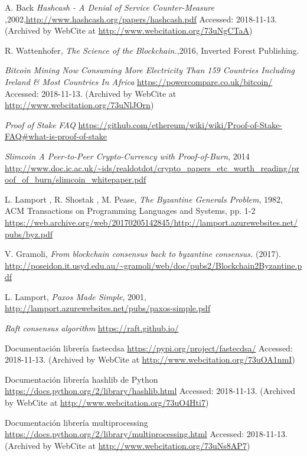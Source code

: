 \documentclass[final, 12pt,oneside]{class_diss}
\begin{document}
\begin{thebibliography}{10}
 A. Back \textit{Hashcash - A Denial of Service Counter-Measure
},2002,\url{http://www.hashcash.org/papers/hashcash.pdf} Accessed: 2018-11-13. (Archived by WebCite at \url{http://www.webcitation.org/73uNgCTaA})

R. Wattenhofer, \textit{The Science of the Blockchain.},2016, Inverted Forest Publishing.

 \textit{Bitcoin Mining Now Consuming More Electricity Than 159 Countries Including Ireland \& Most Countries In Africa} \url{https://powercompare.co.uk/bitcoin/} Accessed: 2018-11-13. (Archived by WebCite at \url{http://www.webcitation.org/73uNlJOrn})

 \textit{Proof of Stake FAQ} \url{https://github.com/ethereum/wiki/wiki/Proof-of-Stake-FAQ#what-is-proof-of-stake}

 \textit{Slimcoin
A Peer-to-Peer Crypto-Currency with Proof-of-Burn}, 2014  \url{http://www.doc.ic.ac.uk/~ids/realdotdot/crypto_papers_etc_worth_reading/proof_of_burn/slimcoin_whitepaper.pdf}

L. Lamport , R. Shostak , M. Pease, \textit{The Byzantine Generals Problem}, 1982,  ACM Transactions on Programming Languages and Systems, pp. 1-2 \url{https://web.archive.org/web/20170205142845/http://lamport.azurewebsites.net/pubs/byz.pdf}

V. Gramoli, \textit{From blockchain consensus back to byzantine consensus.} (2017). \url{http://poseidon.it.usyd.edu.au/~gramoli/web/doc/pubs2/Blockchain2Byzantine.pdf}

 L. Lamport, \textit{Paxos Made Simple}, 2001, \url{http://lamport.azurewebsites.net/pubs/paxos-simple.pdf}

 \textit{Raft consensus algorithm} \url{https://raft.github.io/}

 Documentación librería fastecdsa \url{https://pypi.org/project/fastecdsa/} Accessed: 2018-11-13. (Archived by WebCite at \url{http://www.webcitation.org/73uOA1nmI})

 Documentación librería hashlib de Python \url{https://docs.python.org/2/library/hashlib.html} Accessed: 2018-11-13. (Archived by WebCite at \url{http://www.webcitation.org/73uO4Hti7})

 Documentación librería multiprocessing \url{https://docs.python.org/2/library/multiprocessing.html} Accessed: 2018-11-13. (Archived by WebCite at \url{http://www.webcitation.org/73uNs8AP7})

\end{thebibliography}
\end{document}
